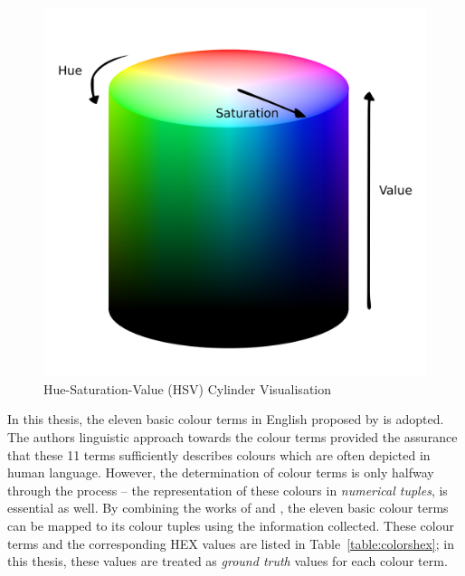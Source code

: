 \begin{figure}[hbt!]\centering
\includegraphics[width=.5\textwidth]{image/general/HSV.png}
\caption{Hue-Saturation-Value (HSV) Cylinder Visualisation}
\label{fig:hsvcylinder}
\end{figure}

In this thesis, the eleven basic colour terms in English proposed by \cite{berlinandkay} is adopted.
The authors linguistic approach towards the colour terms provided the assurance that these 11 terms sufficiently describes colours which are often depicted in human language.
However, the determination of colour terms is only halfway through the process -- the representation of these colours in \textit{numerical tuples}, is essential as well.
By combining the works of  and , the eleven basic colour terms can be mapped to its colour tuples using the information collected. These colour terms and the corresponding HEX values are listed in Table~\ref{table:colorshex}; in this thesis, these values are treated as \textit{ground truth} values for each colour term.


